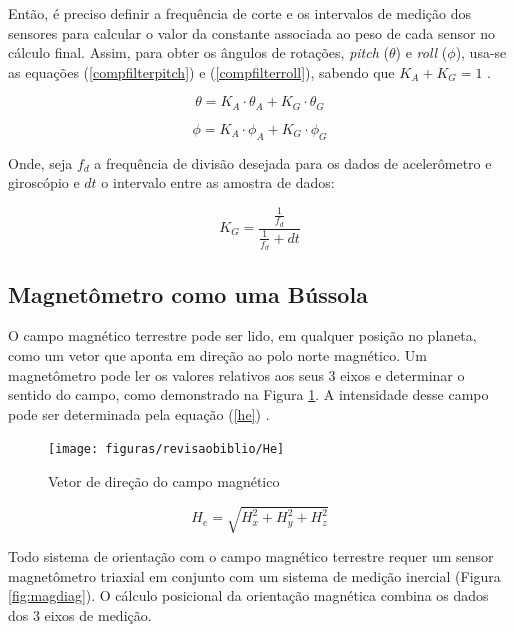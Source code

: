 Então, é preciso definir a frequência de corte e os intervalos de medição dos sensores para calcular o valor da constante associada ao peso de cada sensor no cálculo final. Assim, para obter os ângulos de rotações, \textit{pitch} ($ \theta $) e \textit{roll} ($ \phi $), usa-se as equações (\ref{compfilterpitch}) e (\ref{compfilterroll}), sabendo que $ K_A + K_G = 1 $ \cite{tcc:viniciusPID2Graus}. 


\begin{equation}
	\theta =  K_A \cdot\theta_A + K_G\cdot\theta_G
	\label{compfilterpitch}
\end{equation}

\begin{equation}
	\phi =  K_A \cdot\phi_A + K_G\cdot\phi_G
	\label{compfilterroll}
\end{equation}

Onde, seja $ f_d $ a frequência de divisão desejada para os dados de acelerômetro e giroscópio e $ dt $ o intervalo entre as amostra de dados:

\begin{equation}
	K_G = \dfrac{\frac{1}{f_d}}{\frac{1}{f_d} + dt}
	\label{compfilterroll}
\end{equation}

\subsection{Magnetômetro como uma Bússola}

O campo magnético terrestre pode ser lido, em qualquer posição no planeta, como um vetor que aponta em direção ao polo norte magnético. Um magnetômetro pode ler os valores relativos aos seus 3 eixos e determinar o sentido do campo, como demonstrado na Figura \ref{fig:He}. A intensidade desse campo pode ser determinada pela equação (\ref{he}) \cite{man:Honeywell}.

\begin{figure}[!htb]
	\centering
	\caption{Vetor de direção do campo magnético}
	\texttt{[image: figuras/revisaobiblio/He]}
	\label{fig:He}
\end{figure}

\begin{equation}
	H_e =  \sqrt{H_x^2 + H_y^2 + H_z^2}
	\label{he}
\end{equation}


Todo sistema de orientação com o campo magnético terrestre requer um sensor magnetômetro triaxial em conjunto com um sistema de medição inercial (Figura \ref{fig:magdiag}). O cálculo posicional da orientação magnética combina os dados dos 3 eixos de medição.

